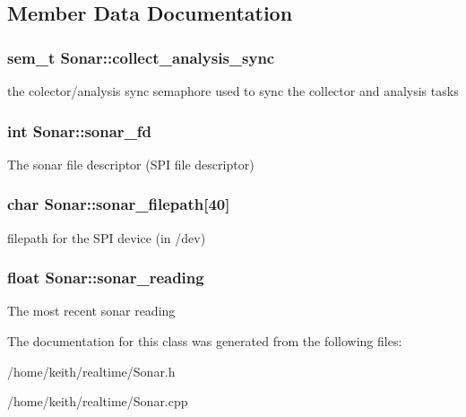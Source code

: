 \subsection{Member Data Documentation}
\hypertarget{classSonar_a3dcf7c38af34539c68f123f073eb2f52}{
\subsubsection[{collect\-\_\-analysis\-\_\-sync}]{\setlength{\rightskip}{0pt plus 5cm}sem\-\_\-t Sonar\-::collect\-\_\-analysis\-\_\-sync\hspace{0.3cm}{\ttfamily [protected]}}}\label{classSonar_a3dcf7c38af34539c68f123f073eb2f52}
the colector/analysis sync semaphore used to sync the collector and analysis tasks \hypertarget{classSonar_a4799c8b328d7735f7e6d62d741340c6c}{
\subsubsection[{sonar\-\_\-fd}]{\setlength{\rightskip}{0pt plus 5cm}int Sonar\-::sonar\-\_\-fd\hspace{0.3cm}{\ttfamily [protected]}}}\label{classSonar_a4799c8b328d7735f7e6d62d741340c6c}
The sonar file descriptor (S\-P\-I file descriptor) \hypertarget{classSonar_a7db9106da9a50d06b5f25c35f799abe5}{
\subsubsection[{sonar\-\_\-filepath}]{\setlength{\rightskip}{0pt plus 5cm}char Sonar\-::sonar\-\_\-filepath\mbox{[}40\mbox{]}\hspace{0.3cm}{\ttfamily [protected]}}}\label{classSonar_a7db9106da9a50d06b5f25c35f799abe5}
filepath for the S\-P\-I device (in /dev) \hypertarget{classSonar_abd3f8ccfc42cacd700df9be06f70c6b2}{
\subsubsection[{sonar\-\_\-reading}]{\setlength{\rightskip}{0pt plus 5cm}float Sonar\-::sonar\-\_\-reading\hspace{0.3cm}{\ttfamily [protected]}}}\label{classSonar_abd3f8ccfc42cacd700df9be06f70c6b2}
The most recent sonar reading 

The documentation for this class was generated from the following files\-:\begin{DoxyCompactItemize}
\item 
/home/keith/realtime/Sonar.\-h\item 
/home/keith/realtime/Sonar.\-cpp\end{DoxyCompactItemize}

